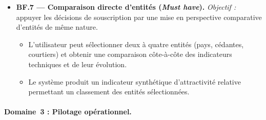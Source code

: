 \documentclass[../main.tex]{subfiles}
\begin{document}
\begin{itemize}[leftmargin=1.5cm, itemsep=6pt]
  \item \textbf{BF.7 --- Comparaison directe d'entités (\textit{Must have}).}
  \emph{Objectif :} appuyer les décisions de souscription par une mise en perspective comparative d'entités de même nature.
  \begin{itemize}[label=\textendash, itemsep=2pt]
    \item L'utilisateur peut sélectionner deux à quatre entités (pays, cédantes, courtiers) et obtenir une comparaison côte-à-côte des indicateurs techniques et de leur évolution.
    \item Le système produit un indicateur synthétique d'attractivité relative permettant un classement des entités sélectionnées.
  \end{itemize}

\end{itemize}

\paragraph{Domaine~3 : Pilotage opérationnel.}
\end{document}
